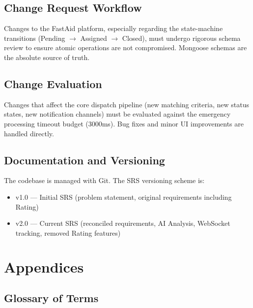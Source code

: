 \documentclass[12pt,a4paper]{article}
\begin{document}
\subsection{Change Request Workflow}
Changes to the FastAid platform, especially regarding the state-machine transitions (Pending $\rightarrow$ Assigned $\rightarrow$ Closed), must undergo rigorous schema review to ensure atomic operations are not compromised. Mongoose schemas are the absolute source of truth.

\subsection{Change Evaluation}
Changes that affect the core dispatch pipeline (new matching criteria, new status states, new notification channels) must be evaluated against the emergency processing timeout budget (3000ms). Bug fixes and minor UI improvements are handled directly.

\subsection{Documentation and Versioning}
The codebase is managed with Git. The SRS versioning scheme is:
\begin{itemize}[leftmargin=2em]
  \item v1.0 --- Initial SRS (problem statement, original requirements including Rating)
  \item v2.0 --- Current SRS (reconciled requirements, AI Analysis, WebSocket tracking, removed Rating features)
\end{itemize}

\section{Appendices}

\subsection{Glossary of Terms}
\end{document}
